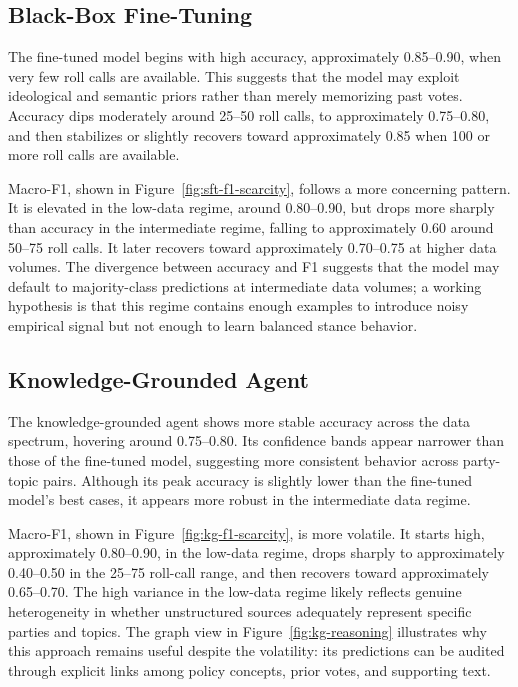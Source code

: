 \documentclass[letterpaper]{article}
\begin{document}
\subsection{Black-Box Fine-Tuning}

The fine-tuned model begins with high accuracy, approximately 0.85--0.90, when very few roll calls are available. This suggests that the model may exploit ideological and semantic priors rather than merely memorizing past votes. Accuracy dips moderately around 25--50 roll calls, to approximately 0.75--0.80, and then stabilizes or slightly recovers toward approximately 0.85 when 100 or more roll calls are available.

Macro-F1, shown in Figure~\ref{fig:sft-f1-scarcity}, follows a more concerning pattern. It is elevated in the low-data regime, around 0.80--0.90, but drops more sharply than accuracy in the intermediate regime, falling to approximately 0.60 around 50--75 roll calls. It later recovers toward approximately 0.70--0.75 at higher data volumes. The divergence between accuracy and F1 suggests that the model may default to majority-class predictions at intermediate data volumes; a working hypothesis is that this regime contains enough examples to introduce noisy empirical signal but not enough to learn balanced stance behavior.

\subsection{Knowledge-Grounded Agent}

The knowledge-grounded agent shows more stable accuracy across the data spectrum, hovering around 0.75--0.80. Its confidence bands appear narrower than those of the fine-tuned model, suggesting more consistent behavior across party-topic pairs. Although its peak accuracy is slightly lower than the fine-tuned model's best cases, it appears more robust in the intermediate data regime.

Macro-F1, shown in Figure~\ref{fig:kg-f1-scarcity}, is more volatile. It starts high, approximately 0.80--0.90, in the low-data regime, drops sharply to approximately 0.40--0.50 in the 25--75 roll-call range, and then recovers toward approximately 0.65--0.70. The high variance in the low-data regime likely reflects genuine heterogeneity in whether unstructured sources adequately represent specific parties and topics. The graph view in Figure~\ref{fig:kg-reasoning} illustrates why this approach remains useful despite the volatility: its predictions can be audited through explicit links among policy concepts, prior votes, and supporting text.
\end{document}
